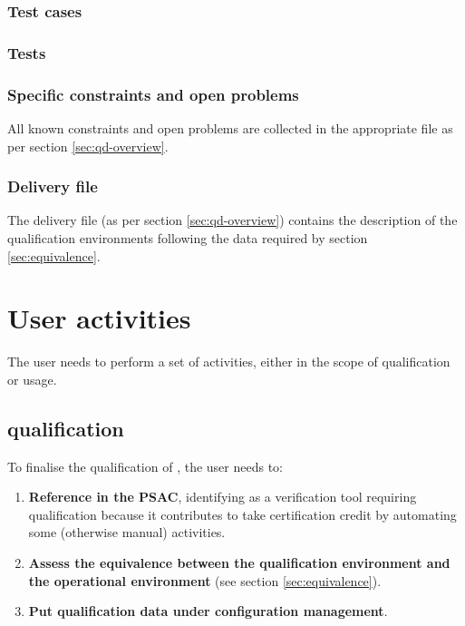 \documentclass {report}
\begin{document}
\subsection{Test cases}
\subsection{Tests}

\subsection{Specific constraints and open problems}
\label{sec:constr-problems}
All known constraints and open problems are collected in the appropriate file as per section \ref{sec:qd-overview}.

\subsection{Delivery file}
\label{sec:delivery}
The delivery file (as per section \ref{sec:qd-overview}) contains the description of the qualification environments following the data required by section \ref{sec:equivalence}.

\chapter{User activities}
\label{sec:user-act}
The user needs to perform a set of activities, either in the scope of \xcov qualification or \xcov usage.

\section{\xcov qualification}
To finalise the qualification of \xcov, the user needs to:
\begin{enumerate}
\item \textbf{Reference \xcov in the PSAC}, identifying \xcov as a verification tool requiring qualification because it contributes to take certification credit by automating some (otherwise manual) activities.
\item \textbf{Assess the equivalence between the qualification environment and the operational environment} (see section \ref{sec:equivalence}).
\item \textbf{Put qualification data under configuration management}.
\end{enumerate}
\end{document}
